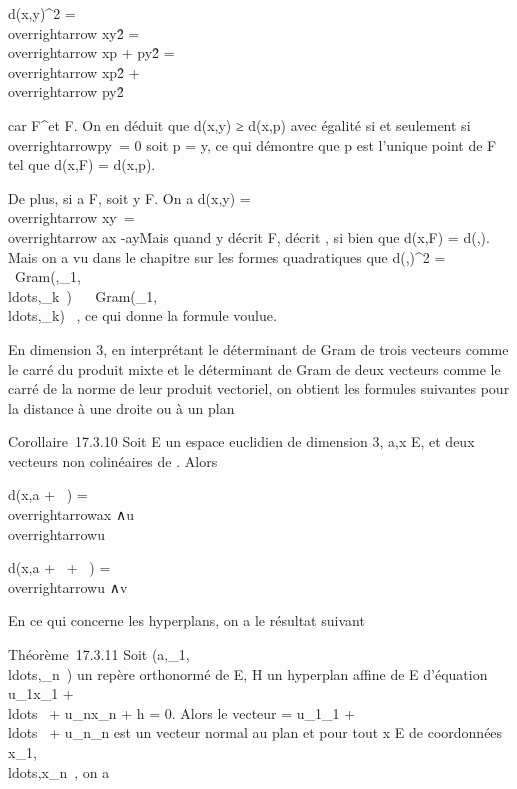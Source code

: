 \documentclass[]{article}
\begin{document}
d(x,y)^2
=\\overrightarrow
xy\^2
=\\overrightarrow xp
+\overrightarrow
py\^2
=\\overrightarrow
xp\^2
+\\overrightarrow
py\^2

car \overrightarrowxp
\in\overrightarrow F^\bot et
\overrightarrowpy \in F. On en déduit que d(x,y) ≥
d(x,p) avec égalité si et seulement
si~\\overrightarrowpy\
= 0 soit p = y, ce qui démontre que p est l'unique point de F tel que
d(x,F) = d(x,p).

De plus, si a \in F, soit y \in F. On a d(x,y)
=\\overrightarrow
xy\
=\
-\. Mais
quand y décrit F, \overrightarroway décrit
\overrightarrowF, si bien que d(x,F) =
d(\overrightarrowax,\overrightarrowF).
Mais on a vu dans le chapitre sur les formes quadratiques que
d(\overrightarrow\xi,\overrightarrowF)^2
= \mathrm{det}~
\
Gram(\overrightarrow\xi,\vece_1,\\ldots,\vece_k~)
\over
{}~
\
Gram(\vece_1,\\ldots,\vece_k)~
, ce qui donne la formule voulue.

En dimension 3, en interprétant le déterminant de Gram de trois vecteurs
comme le carré du produit mixte et le déterminant de Gram de deux
vecteurs comme le carré de la norme de leur produit vectoriel, on
obtient les formules suivantes pour la distance à une droite ou à un
plan

Corollaire~17.3.10 Soit E un espace euclidien de dimension 3, a,x \in E,
\overrightarrowu et
\overrightarrowv deux vecteurs non colinéaires de
\overrightarrowE. Alors

d(x,a + ~\overrightarrowu) =
\\overrightarrowax
∧\
\over
\\overrightarrowu\

d(x,a + \mathbb{R}~\overrightarrowu +
\mathbb{R}~\overrightarrowv) = \Big
[\overrightarrowax,\overrightarrowu,\overrightarrowv]\Big
 \over
\\overrightarrowu
∧\overrightarrow v\

En ce qui concerne les hyperplans, on a le résultat suivant

Théorème~17.3.11 Soit
(a,\vece_1,\\ldots,\vece_n~)
un repère orthonormé de E, H un hyperplan affine de E d'équation
u_1x_1 +
\\ldots~ +
u_nx_n + h = 0. Alors le vecteur
\overrightarrown =
u_1\vece_1 +
\\ldots~ +
u_n\vece_n est un vecteur normal au
plan et pour tout x \in E de coordonnées
x_1,\\ldots,x_n~,
on a
\end{document}
